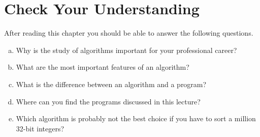 \section{Check Your Understanding}
After reading this chapter you should be able to answer the following questions.
\begin{enumerate}[(a)]
\item Why is the study of algorithms important for your professional career?
\item What are the most important features of an algorithm?
\item What is the difference between an algorithm and a program?
\item Where can you find the programs discussed in this lecture?
\item Which algorithm is probably not the best choice if you have to sort a million 32-bit integers? 
\end{enumerate}

